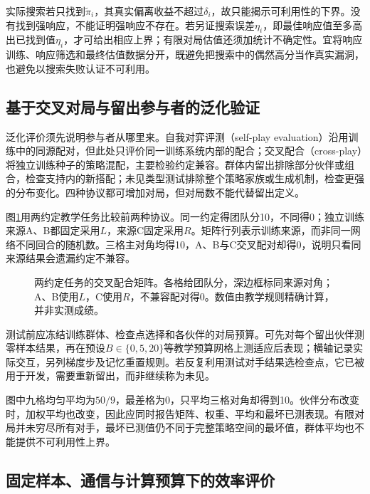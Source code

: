 实际搜索若只找到$\tilde\pi_i$，其真实偏离收益不超过$\delta_i$，故只能揭示可利用性的下界。没有找到强响应，不能证明强响应不存在。若另证搜索误差$\eta_i$，即最佳响应值至多高出已找到值$\eta_i$，才可给出相应上界；有限对局估值还须加统计不确定性。宜将响应训练、响应筛选和最终估值数据分开，既避免把搜索中的偶然高分当作真实漏洞，也避免以搜索失败认证不可利用。

\subsection{基于交叉对局与留出参与者的泛化验证}
\label{sec:rl-multi-agent-cross-play}

泛化评价须先说明参与者从哪里来。自我对弈评测（self-play evaluation）沿用训练中的同源配对，但此处只评价同一训练系统内部的配合；交叉配合（cross-play）将独立训练种子的策略混配，主要检验约定兼容。群体内留出排除部分伙伴或组合，检查支持内的新搭配；未见类型测试排除整个策略家族或生成机制，检查更强的分布变化。四种协议都可增加对局，但对局数不能代替留出定义。

图\ref{fig:rl-multi-agent-cross-play}用两约定教学任务比较前两种协议。同一约定得团队分10，不同得0；独立训练来源A、B都固定采用$L$，来源C固定采用$R$。矩阵行列表示训练来源，而非同一网络不同回合的随机数。三格主对角均得10，A、B与C交叉配对却得0，说明只看同来源结果会遗漏约定不兼容。

\begin{figure}[htbp]
 \centering
 
 \caption{两约定任务的交叉配合矩阵。各格给团队分，深边框标同来源对角；A、B使用$L$，C使用$R$，不兼容配对得0。数值由教学规则精确计算，并非实测成绩。}
 \label{fig:rl-multi-agent-cross-play}
\end{figure}

测试前应冻结训练群体、检查点选择和各伙伴的对局预算。可先对每个留出伙伴测零样本结果，再在预设$B\in\{0,5,20\}$等教学预算网格上测适应后表现；横轴记录实际交互，另列梯度步及记忆重置规则。若反复利用测试对手结果选检查点，它已被用于开发，需要重新留出，而非继续称为未见。

图中九格均匀平均为$50/9$，最差格为0，只平均三格对角却得到10。伙伴分布改变时，加权平均也改变，因此应同时报告矩阵、权重、平均和最坏已测表现。有限对局并未穷尽所有对手，最坏已测值仍不同于完整策略空间的最坏值，群体平均也不能提供不可利用性上界。

\subsection{固定样本、通信与计算预算下的效率评价}
\label{sec:rl-multi-agent-efficiency}

